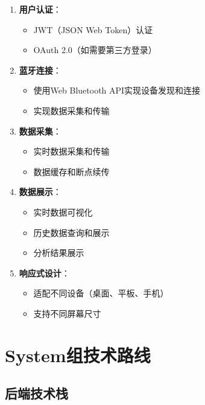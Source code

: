 \documentclass[a4paper,12pt]{article}
\begin{document}
\begin{enumerate}
  \item \textbf{用户认证}：
    \begin{itemize}
      \item JWT（JSON Web Token）认证
      \item OAuth 2.0（如需要第三方登录）
    \end{itemize}
  
  \item \textbf{蓝牙连接}：
    \begin{itemize}
      \item 使用Web Bluetooth API实现设备发现和连接
      \item 实现数据采集和传输
    \end{itemize}
  
  \item \textbf{数据采集}：
    \begin{itemize}
      \item 实时数据采集和传输
      \item 数据缓存和断点续传
    \end{itemize}
  
  \item \textbf{数据展示}：
    \begin{itemize}
      \item 实时数据可视化
      \item 历史数据查询和展示
      \item 分析结果展示
    \end{itemize}
  
  \item \textbf{响应式设计}：
    \begin{itemize}
      \item 适配不同设备（桌面、平板、手机）
      \item 支持不同屏幕尺寸
    \end{itemize}
\end{enumerate}

\section{System组技术路线}

\subsection{后端技术栈}
\end{document}
